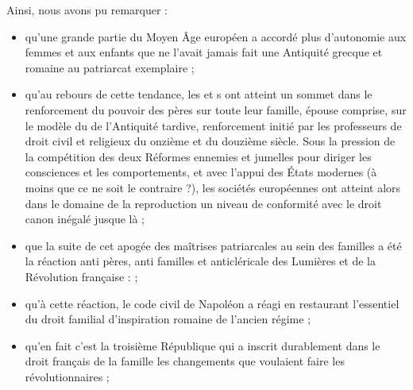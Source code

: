  Ainsi, nous avons pu remarquer : 
\begin{itemize}

\item qu'une grande partie du Moyen Âge européen a accordé plus d'autonomie aux femmes et aux enfants que ne l'avait jamais fait une Antiquité grecque et romaine au patriarcat exemplaire ;

\item qu'au rebours de cette tendance, les  et s ont atteint un sommet dans le renforcement du pouvoir des pères sur toute leur famille, épouse comprise, sur le modèle du  de l'Antiquité tardive, renforcement initié par les professeurs de droit civil et religieux du onzième et du douzième siècle. Sous la pression de la compétition des deux Réformes ennemies et jumelles pour diriger les consciences et les comportements, et avec l'appui des États modernes (à moins que ce ne soit le contraire ?), les sociétés européennes ont atteint alors dans le domaine de la reproduction un niveau de conformité avec le droit canon inégalé jusque là ;

\item que la suite de cet apogée des maîtrises patriarcales au sein des familles a été la réaction anti pères, anti familles et anticléricale des Lumières et de la Révolution française :  ;

\item qu'à cette réaction, le code civil de Napoléon a réagi en restaurant l'essentiel du droit familial d'inspiration romaine de l'ancien régime ;
 
\item qu'en fait c'est la troisième République qui a inscrit durablement dans le droit français de la famille les changements que voulaient faire les révolutionnaires ;
 

\end{itemize}
